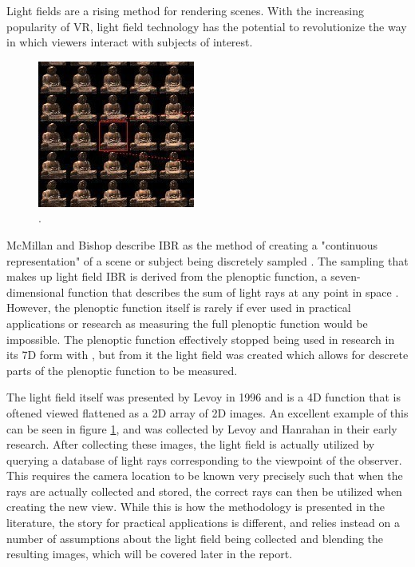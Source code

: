 \documentclass[12pt]{report}
\begin{document}
Light fields are a rising method for rendering scenes. With the increasing popularity of VR, light field technology has the potential to revolutionize the way in which viewers interact with subjects of interest.
\begin{figure}[!ht]
	\centering
	\includegraphics[scale=1]{levoy_lf.jpg}
	\caption{ \cite{Levoy96}.}
	\label{fig:levoy_lf}
\end{figure}
McMillan and Bishop describe IBR as the method of creating a "continuous representation" of a scene or subject being discretely sampled \cite{McMillan95}. The sampling that makes up light field IBR is derived from the plenoptic function, a seven-dimensional function that describes the sum of light rays at any point in space \cite{Adelson91}. However, the plenoptic function itself is rarely if ever used in practical applications or research as measuring the full plenoptic function would be impossible. The plenoptic function effectively stopped being used in research in its 7D form with \cite{Adelson91}, but from it the light field was created which allows for descrete parts of the plenoptic function to be measured.

The light field itself was presented by Levoy in 1996 and is a 4D function that is oftened viewed flattened as a 2D array of 2D images. An excellent example of this can be seen in figure \ref{fig:levoy_lf}, and was collected by Levoy and Hanrahan in their early research. After collecting these images, the light field is actually utilized by querying a database of light rays corresponding to the viewpoint of the observer. This requires the camera location to be known very precisely such that when the rays are actually collected and stored, the correct rays can then be utilized when creating the new view. While this is how the methodology is presented in the literature, the story for practical applications is different, and relies instead on a number of assumptions about the light field being collected and blending the resulting images, which will be covered later in the report.
\end{document}
